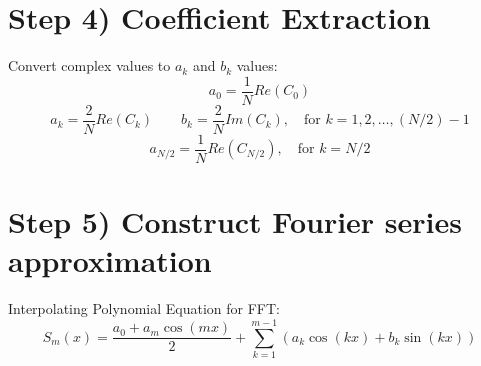 \documentclass[12pt]{article}
\begin{document}
\section*{Step 4) Coefficient Extraction}
Convert complex values to $a_k$ and $b_k$ values:
\[a_0 = \frac{1}{N}Re(C_0)\]
\[a_k = \frac{2}{N}Re(C_k) \quad \quad b_k = \frac{2}{N}Im(C_k), \quad \text{for } k=1,2,\ldots,(N/2)-1\]
\[a_{N/2} = \frac{1}{N}Re(C_{N/2}), \quad \text{for } k = N/2\]

\section*{Step 5) Construct Fourier series approximation}
Interpolating Polynomial Equation for FFT:
\[S_m(x) = \frac{a_0 + a_m\cos(mx)}{2} + \sum_{k=1}^{m-1}(a_k\cos(kx) + b_k\sin(kx))\]
\end{document}
